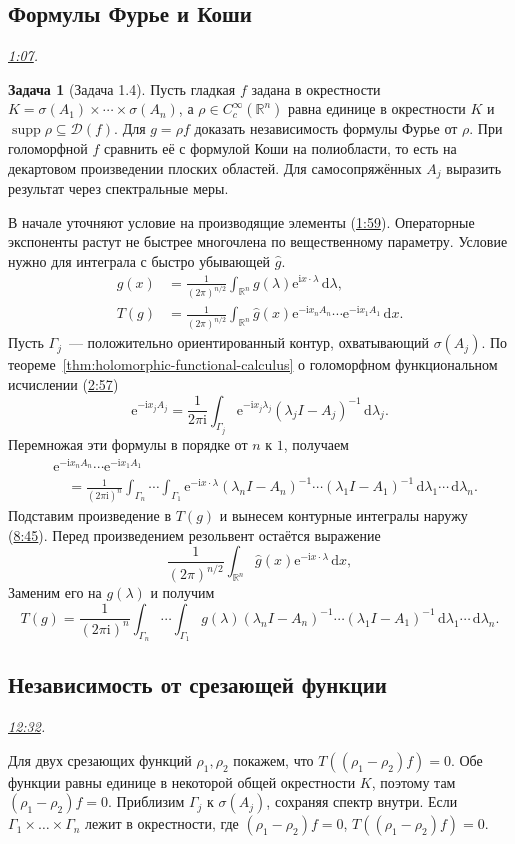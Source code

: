 \documentclass[11pt,a4paper]{article}
\theoremstyle{plain}
\theoremstyle{definition}
\newtheorem{exercise}[theorem]{Задача}
\newcommand{\RR}{\mathbb R}
\newcommand{\Dom}{\mathcal D}
\newcommand{\id}{I}
\newcommand{\dd}{\,\mathrm d}
\newcommand{\ii}{\mathrm i}
\newcommand{\ee}{\mathrm e}
\DeclareMathOperator{\supp}{supp}
\newcommand{\at}[3]{\href{https://www.youtube.com/watch?v=#1&t=#2s}{#3}}
\newcommand{\topic}[2]{\Needspace{5\baselineskip}\subsection*{#1}\noindent\emph{#2.}\par\nobreak\smallskip}
\begin{document}
\topic{Формулы Фурье и Коши}{\at{ZDZiS1ShThI}{67}{1:07}}
\begin{exercise}[Задача 1.4]
Пусть гладкая $f$ задана в окрестности
$K=\sigma(A_1)\times\cdots\times\sigma(A_n)$, а
$\rho\in C_c^\infty(\RR^n)$ равна единице в окрестности $K$ и $\supp \rho \subseteq \Dom(f)$.
Для $g=\rho f$ доказать независимость формулы Фурье от $\rho$.
При голоморфной $f$ сравнить её с формулой Коши на полиобласти,
то есть на декартовом произведении плоских областей.
Для самосопряжённых $A_j$ выразить результат через спектральные меры.
\end{exercise}
В начале уточняют условие на производящие элементы
(\at{ZDZiS1ShThI}{119}{1:59}). Операторные экспоненты растут
не быстрее многочлена по вещественному параметру. Условие нужно
для интеграла с быстро убывающей $\widehat g$.
\[
 \begin{aligned}
 \widehat g(x)&=\frac{1}{(2\pi)^{n/2}}
       \int_{\RR^n}g(\lambda)\ee^{\ii x\cdot\lambda}\dd\lambda,\\
 T(g)&=\frac{1}{(2\pi)^{n/2}}\int_{\RR^n}
   \widehat g(x)\ee^{-\ii x_n A_n}\cdots\ee^{-\ii x_1 A_1}\dd x .
 \end{aligned}
\]
Пусть $\Gamma_j$~--- положительно ориентированный контур,
охватывающий $\sigma(A_j)$. По теореме~\ref{thm:holomorphic-functional-calculus}
о голоморфном функциональном исчислении
(\at{ZDZiS1ShThI}{177}{2:57})
\[
 \ee^{-\ii x_jA_j}=\frac{1}{2\pi\ii}
 \int_{\Gamma_j}\ee^{-\ii x_j\lambda_j}
            (\lambda_j\id-A_j)^{-1}\dd\lambda_j .
\]
Перемножая эти формулы в порядке от $n$ к $1$, получаем
\[
 \begin{aligned}
 &\ee^{-\ii x_nA_n}\cdots\ee^{-\ii x_1A_1}\\
 &\quad=\frac{1}{(2\pi\ii)^n}
   \int_{\Gamma_n}\!\cdots\!\int_{\Gamma_1}
   \ee^{-\ii x\cdot\lambda}
   (\lambda_n\id-A_n)^{-1}\cdots(\lambda_1\id-A_1)^{-1}
   \dd\lambda_1\cdots\dd\lambda_n .
 \end{aligned}
\]
Подставим произведение в $T(g)$ и вынесем контурные интегралы
наружу (\at{ZDZiS1ShThI}{525}{8:45}). Перед произведением
резольвент остаётся выражение
\[
 \frac{1}{(2\pi)^{n/2}}\int_{\RR^n}
              \widehat g(x)\ee^{-\ii x\cdot\lambda}\dd x,
\]
Заменим его на $g(\lambda)$ и получим
\[
 T(g)=\frac{1}{(2\pi\ii)^n}
 \int_{\Gamma_n}\!\cdots\!\int_{\Gamma_1}g(\lambda)
 (\lambda_n\id-A_n)^{-1}\cdots(\lambda_1\id-A_1)^{-1}
 \dd\lambda_1\cdots\dd\lambda_n .
\]

\topic{Независимость от срезающей функции}{\at{ZDZiS1ShThI}{752}{12:32}}
Для двух срезающих функций $\rho_1,\rho_2$ покажем, что $T((\rho_1-\rho_2)f)=0$. Обе функции равны единице
в некоторой общей окрестности $K$, поэтому там $(\rho_1-\rho_2)f=0$.
Приблизим $\Gamma_j$ к $\sigma(A_j)$,
сохраняя спектр внутри. Если $\Gamma_1 \times \ldots \times \Gamma_n$ лежит в
окрестности, где $(\rho_1-\rho_2)f=0$, $T((\rho_1-\rho_2)f)=0$.
\end{document}

